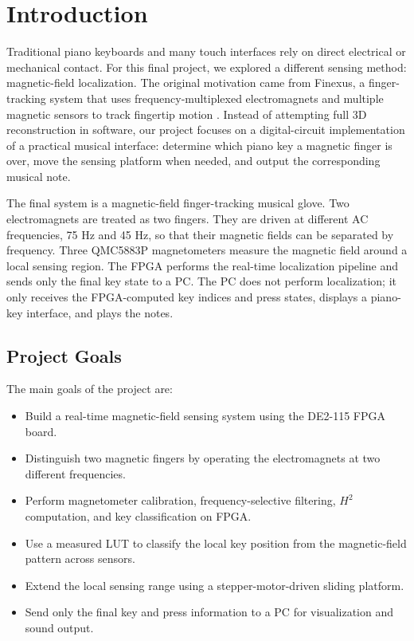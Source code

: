 \section{Introduction}
\label{sec:introduction}

Traditional piano keyboards and many touch interfaces rely on direct electrical or mechanical contact. For this final project, we explored a different sensing method: magnetic-field localization. The original motivation came from Finexus, a finger-tracking system that uses frequency-multiplexed electromagnets and multiple magnetic sensors to track fingertip motion \cite{chen2016finexus}. Instead of attempting full 3D reconstruction in software, our project focuses on a digital-circuit implementation of a practical musical interface: determine which piano key a magnetic finger is over, move the sensing platform when needed, and output the corresponding musical note.

The final system is a magnetic-field finger-tracking musical glove. Two electromagnets are treated as two fingers. They are driven at different AC frequencies, 75 Hz and 45 Hz, so that their magnetic fields can be separated by frequency. Three QMC5883P magnetometers measure the magnetic field around a local sensing region. The FPGA performs the real-time localization pipeline and sends only the final key state to a PC. The PC does not perform localization; it only receives the FPGA-computed key indices and press states, displays a piano-key interface, and plays the notes.

\subsection{Project Goals}

The main goals of the project are:

\begin{itemize}
    \item Build a real-time magnetic-field sensing system using the DE2-115 FPGA board.
    \item Distinguish two magnetic fingers by operating the electromagnets at two different frequencies.
    \item Perform magnetometer calibration, frequency-selective filtering, $H^2$ computation, and key classification on FPGA.
    \item Use a measured LUT to classify the local key position from the magnetic-field pattern across sensors.
    \item Extend the local sensing range using a stepper-motor-driven sliding platform.
    \item Send only the final key and press information to a PC for visualization and sound output.
\end{itemize}

